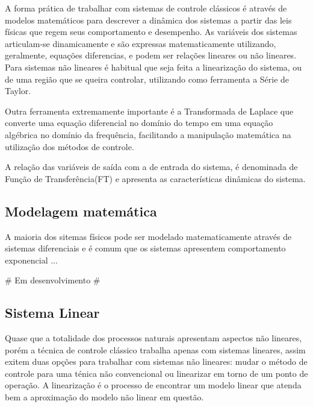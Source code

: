A forma prática de trabalhar com sistemas de controle clássicos é através de modelos matemáticos para descrever a dinâmica dos sistemas a partir das leis físicas que regem seus comportamento e desempenho.
As variáveis dos sistemas articulam-se dinamicamente e são expressas matematicamente utilizando, geralmente, equações diferencias, e podem ser relações lineares ou não lineares. Para sistemas não lineares é habitual que seja feita a linearização do sistema, ou de uma região que se queira controlar, utilizando como ferramenta a Série de Taylor. 

Outra ferramenta extremamente importante é a Transformada de Laplace que converte uma equação diferencial no domínio do tempo em uma equação algébrica no domínio da frequência, facilitando a manipulação matemática na utilização dos métodos de controle. 

A relação das variáveis de saída com a de entrada do sistema, é denominada de Função de Transferência(FT) e apresenta as características dinâmicas do sistema.



\subsection{Modelagem matemática}

A maioria dos sitemas físicos pode ser modelado matematicamente através de sistemas diferenciais e é comum que os sistemas apresentem comportamento exponencial ...

\# Em desenvolvimento \#



\subsection{Sistema Linear}

Quase que a totalidade dos processos naturais apresentam aspectos não lineares, porém a técnica de controle clássico trabalha apenas com sistemas lineares, assim exitem duas opções para trabalhar com sistemas não lineares: mudar o método de controle para uma ténica não convencional ou linearizar em torno de um ponto de operação. A linearização é o processo de encontrar um modelo linear que atenda bem a aproximação do modelo não linear em questão.

